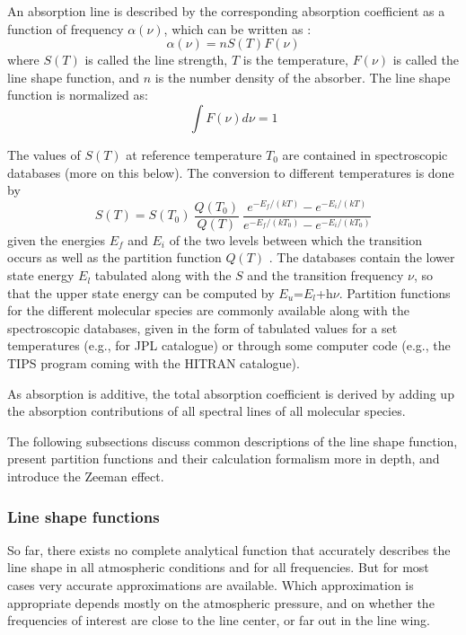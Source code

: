 An absorption line is described by the corresponding 
absorption coefficient as a function of frequency $\alpha(\nu)$, which
can be written as \citep{goodyandyung:89}:
\begin{equation}\label{eq:abs_coeff}
  \alpha(\nu)=nS(T)F(\nu)
\end{equation} 
where $S(T)$ is called the line strength, $T$ is the temperature,
$F(\nu)$ is called the line shape function, and
$n$ is the number density of the absorber. The line shape
function is normalized as:
\begin{equation}\label{eq:abs_theory:line_shape_norm}
  \int F(\nu)d\nu=1
\end{equation}

The values of $S(T)$ at reference temperature $T_0$ are contained in
spectroscopic databases (more on this below). The conversion to
different temperatures is done by
\begin{equation}\label{eq:abs_theory:line_intensity}
  S(T)=S(T_0)~\frac{Q(T_0)}{Q(T)}~\frac{e^{-E_f/(kT)}
    - e^{-E_i/(kT)}}{e^{-E_f/(kT_0)} - e^{-E_i/(kT_0)}}
\end{equation}
given the energies $E_f$ and $E_i$ of the two levels between which the
transition occurs as well as the partition function  $Q(T)$ \citep{rothman:98}.
The databases contain the lower state energy $E_l$ tabulated along with
the $S$ and the transition frequency $\nu$, so that the upper state
energy can be computed by $E_u$=$E_l$+h$\nu$. Partition functions for
the different molecular species are commonly available along with the
spectroscopic databases, given in the form of tabulated values for a set
temperatures (e.g., for JPL catalogue) or through some computer code (e.g.,
the TIPS program coming with the HITRAN catalogue).

As absorption is additive, the total absorption coefficient is derived by 
adding up the absorption contributions of all spectral lines of all molecular 
species.

The following subsections discuss common descriptions of the line shape
function, present partition functions and their calculation formalism more in
depth, and introduce the Zeeman effect.


\subsubsection{Line shape functions} 
\label{sec:abs_theory:shape}

So far, there exists no complete analytical function that accurately
describes the line shape in all atmospheric conditions and for all
frequencies. But for most cases very accurate approximations are
available. Which approximation is appropriate depends mostly on the
atmospheric pressure, and on whether the frequencies of interest are
close to the line center, or far out in the line wing.

